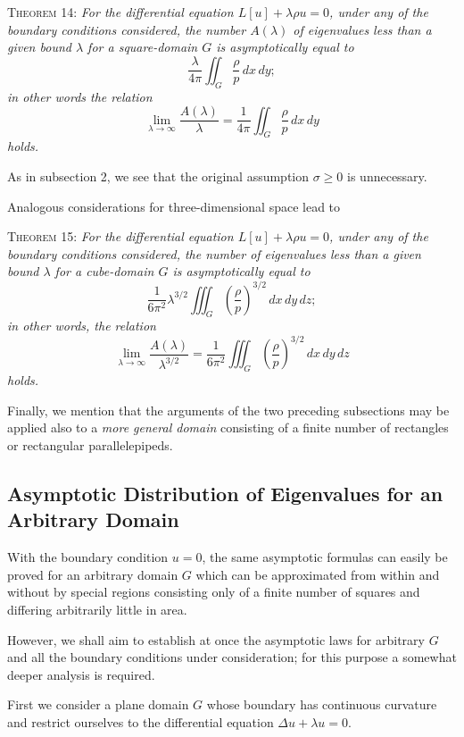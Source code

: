 \textsc{Theorem 14:} \emph{For the differential equation $L[u]+\lambda\rho u=0$, under any of the boundary conditions considered, the number $A(\lambda)$ of eigenvalues less than a given bound $\lambda$ for a square-domain $G$ is asymptotically equal to}
\[
\frac{\lambda}{4\pi}\iint_G\frac{\rho}{p}\,dx\,dy;
\]
\emph{in other words the relation}
\begin{equation}\tag{31}
\lim_{\lambda\to\infty}\frac{A(\lambda)}{\lambda}
=\frac1{4\pi}\iint_G\frac{\rho}{p}\,dx\,dy
\end{equation}
\emph{holds.}

As in subsection 2, we see that the original assumption $\sigma\ge0$ is unnecessary.

Analogous considerations for three-dimensional space lead to

\textsc{Theorem 15:} \emph{For the differential equation $L[u]+\lambda\rho u=0$, under any of the boundary conditions considered, the number of eigenvalues less than a given bound $\lambda$ for a cube-domain $G$ is asymptotically equal to}
\[
\frac1{6\pi^2}\lambda^{3/2}\iiint_G\left(\frac{\rho}{p}\right)^{3/2}\,dx\,dy\,dz;
\]
\emph{in other words, the relation}
\begin{equation}\tag{32}
\lim_{\lambda\to\infty}\frac{A(\lambda)}{\lambda^{3/2}}
=\frac1{6\pi^2}\iiint_G\left(\frac{\rho}{p}\right)^{3/2}\,dx\,dy\,dz
\end{equation}
\emph{holds.}

Finally, we mention that the arguments of the two preceding subsections may be applied also to a \emph{more general domain} consisting of a finite number of rectangles or rectangular parallelepipeds.

\subsection{Asymptotic Distribution of Eigenvalues for an Arbitrary Domain}
With the boundary condition $u=0$, the same asymptotic formulas can easily be proved for an arbitrary domain $G$ which can be approximated from within and without by special regions consisting only of a finite number of squares and differing arbitrarily little in area.

However, we shall aim to establish at once the asymptotic laws for arbitrary $G$ and all the boundary conditions under consideration; for this purpose a somewhat deeper analysis is required.

First we consider a plane domain $G$ whose boundary has continuous curvature and restrict ourselves to the differential equation $\Delta u+\lambda u=0$.

